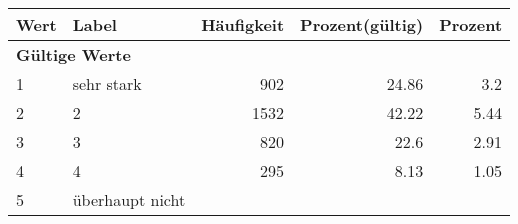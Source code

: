      \begin{longtable}{lXrrr}
     \toprule
     \textbf{Wert} & \textbf{Label} & \textbf{Häufigkeit} & \textbf{Prozent(gültig)} & \textbf{Prozent} \\
     \endhead
     \midrule
     \multicolumn{5}{l}{\textbf{Gültige Werte}}\\

     1 &
     \multicolumn{1}{X}{ sehr stark   } &


       \num{902} &
       \num[round-mode=places,round-precision=2]{24.86} &
         \num[round-mode=places,round-precision=2]{3.2} \\

     2 &
     \multicolumn{1}{X}{ 2   } &


       \num{1532} &
       \num[round-mode=places,round-precision=2]{42.22} &
         \num[round-mode=places,round-precision=2]{5.44} \\

     3 &
     \multicolumn{1}{X}{ 3   } &


       \num{820} &
       \num[round-mode=places,round-precision=2]{22.6} &
         \num[round-mode=places,round-precision=2]{2.91} \\

     4 &
     \multicolumn{1}{X}{ 4   } &


       \num{295} &
       \num[round-mode=places,round-precision=2]{8.13} &
         \num[round-mode=places,round-precision=2]{1.05} \\

     5 &
     \multicolumn{1}{X}{ überhaupt nicht   } &



\end{longtable}

